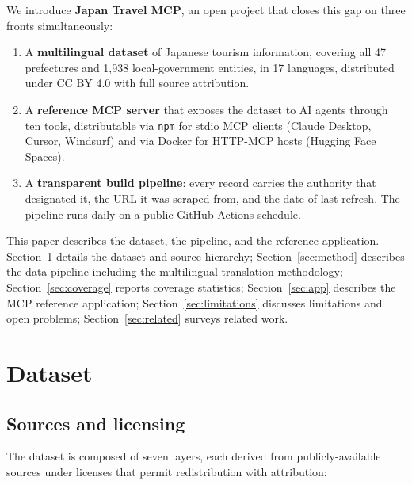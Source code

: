 \documentclass[11pt,a4paper]{article}
\begin{document}
We introduce \textbf{Japan Travel MCP}, an open project that closes this
gap on three fronts simultaneously:

\begin{enumerate}
  \item A \textbf{multilingual dataset} of Japanese tourism information,
  covering all 47 prefectures and 1{,}938 local-government entities, in
  17 languages, distributed under CC BY 4.0 with full source attribution.
  \item A \textbf{reference MCP server} that exposes the dataset to AI
  agents through ten tools, distributable via \texttt{npm} for stdio MCP
  clients (Claude Desktop, Cursor, Windsurf) and via Docker for HTTP-MCP
  hosts (Hugging Face Spaces).
  \item A \textbf{transparent build pipeline}: every record carries the
  authority that designated it, the URL it was scraped from, and the date
  of last refresh. The pipeline runs daily on a public GitHub Actions
  schedule.
\end{enumerate}

This paper describes the dataset, the pipeline, and the reference
application. Section~\ref{sec:data} details the dataset and source
hierarchy; Section~\ref{sec:method} describes the data pipeline including
the multilingual translation methodology; Section~\ref{sec:coverage}
reports coverage statistics; Section~\ref{sec:app} describes the MCP
reference application; Section~\ref{sec:limitations} discusses limitations
and open problems; Section~\ref{sec:related} surveys related work.

\section{Dataset}
\label{sec:data}

\subsection{Sources and licensing}

The dataset is composed of seven layers, each derived from publicly-available
sources under licenses that permit redistribution with attribution:
\end{document}
